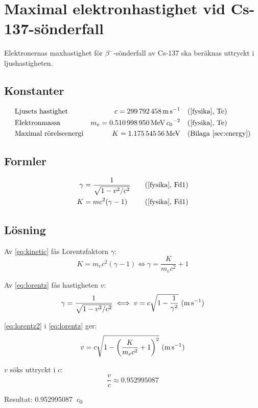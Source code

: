\section{Maximal elektronhastighet vid Cs-137-sönderfall} \label{sec:speed}

Elektronernas maxhastighet för $\beta^-$-sönderfall av Cs-137 ska beräknas
uttryckt i ljushastigheten.

\subsection*{Konstanter}

\begin{align*}
    & \text{Ljusets hastighet}     & c   = \qty{299792458}{\m\per\s}                  &\quad \fysika{Te}                      \\
    & \text{Elektronmassa}         & m_e = \qty{0.510998950}{\MeV\per\clight\squared} &\quad \fysika{Te}                      \\
    & \text{Maximal rörelseenergi} & K   = \qty{1.17554556}{\MeV}                     &\quad \text{(Bilaga~\ref{sec:energy})}
\end{align*}

\subsection*{Formler}

\begin{align}
    \gamma &= \frac{1}{\sqrt{1 - v^2/c^2}} &\quad \fysika{Fd1} \label{eq:lorentz} \\
         K &= mc^2(\gamma - 1)             &\quad \fysika{Fd1} \label{eq:kinetic}
\end{align}

\subsection*{Lösning}

Av \eqref{eq:kinetic} fås Lorentzfaktorn $\gamma$:
%
\begin{equation}
    K = m_e c^2(\gamma - 1) \iff \gamma = \frac{K}{m_e c^2} + 1 \label{eq:lorentz2}
\end{equation}

Av \eqref{eq:lorentz} fås hastigheten $v$:
%
\begin{equation}
    \gamma = \frac{1}{\sqrt{1 - v^2/c^2}} \iff v = c \sqrt{1 - \frac{1}{\gamma^2}} \inlineunit{\m\per\s} \label{eq:speed}
\end{equation}

\eqref{eq:lorentz2} i \eqref{eq:lorentz} ger:
%
\begin{equation}
    v = c \sqrt{1 - \left( \frac{K}{m_e c^2} + 1 \right)^2} \inlineunit{\m\per\s}
\end{equation}

$v$ söks uttryckt i $c$:
%
\begin{equation}
    \frac{v}{c} \approx \num{0.952995087}
\end{equation}

Resultat: \qty{0.952995087}{\clight}
